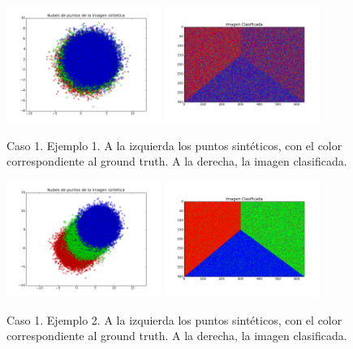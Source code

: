 \documentclass[a4paper,11pt]{article}
\begin{document}
\begin{figure}[h!]
\centering
\includegraphics[width=0.45\textwidth]{img/ej2-caso1a-puntos.png}
\includegraphics[width=0.45\textwidth]{img/ej2-caso1a-clfPhantom.png}
\caption{Caso 1. Ejemplo 1. A la izquierda los puntos sintéticos, con el color correspondiente al ground truth. A la derecha, la imagen clasificada.}
\label{ej2_caso1a}
\end{figure}

\begin{figure}[h!]
\centering
\includegraphics[width=0.45\textwidth]{img/ej2-caso1b-puntos.png}
\includegraphics[width=0.45\textwidth]{img/ej2-caso1b-clfPhantom.png}
\caption{Caso 1. Ejemplo 2. A la izquierda los puntos sintéticos, con el color correspondiente al ground truth. A la derecha, la imagen clasificada.}
\label{ej2_caso1b}
\end{figure}
\end{document}
